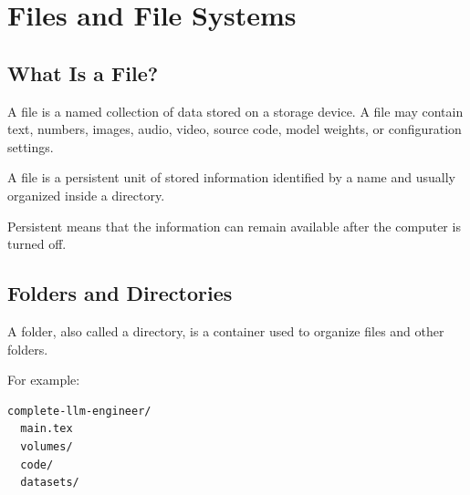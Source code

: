 \chapter{Files and File Systems}
\label{chap:files-and-file-systems}



\section{What Is a File?}

A file is a named collection of data stored on a storage device. A file may contain text, numbers, images, audio, video, source code, model weights, or configuration settings.

\begin{definition}
A file is a persistent unit of stored information identified by a name and usually organized inside a directory.
\end{definition}

Persistent means that the information can remain available after the computer is turned off.

\section{Folders and Directories}

A folder, also called a directory, is a container used to organize files and other folders.

For example:

\begin{lstlisting}[language=bash]
complete-llm-engineer/
  main.tex
  volumes/
  code/
  datasets/
\end{lstlisting}

